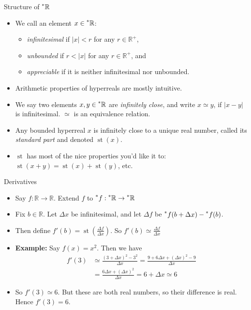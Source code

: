 \documentclass{beamer}
\theoremstyle{plain}
\theoremstyle{definition}
\newcommand{\stp}[1]{\st\left(#1\right)}
\newcommand{\reals}{\mathbb{R}}
\newcommand{\hreals}{\prescript{*}{}{\mathbb{R}}}
\newcommand{\hr}[1]{\prescript{*}{}{#1}}
\DeclareMathOperator{\st}{st}
\begin{document}
\begin{frame}{Structure of $\hreals$}
\begin{itemize}
\setlength{\itemsep}{10pt}
\item We call an element $x \in \hreals$:
	\begin{itemize}
	\item \textit{infinitesimal} if $|x| < r$ for any $r \in \reals^+$,
	\item \textit{unbounded} if $r < |x|$ for any $r \in \reals^+$, and
	\item \textit{appreciable} if it is neither infinitesimal nor unbounded.
	\end{itemize}
\item Arithmetic properties of hyperreals are mostly intuitive.
\item We say two elements $x, y \in \hreals$ are \textit{infinitely close}, and write $x \simeq y$, if $|x - y|$ is infinitesimal. $\simeq$ is an equivalence relation.
\item Any bounded hyperreal $x$ is infinitely close to a unique real number, called its \textit{standard part} and denoted $\stp{x}$.
\item $\st$ has most of the nice properties you'd like it to: $\stp{x + y} = \stp{x} + \stp{y}$, etc.
\end{itemize}
\end{frame}


\begin{frame}{Derivatives}
\begin{itemize}
\item Say $f: \reals \to \reals$. Extend $f$ to $\hr{f}: \hreals \to \hreals$
\item Fix $b \in \reals$. Let $\Delta x$ be infinitesimal, and let $\Delta f$ be $\hr{f}(b + \Delta x) - \hr{f}(b)$.
\item Then define $f'(b) = \stp{\frac{\Delta f}{\Delta x}}$. So $f'(b) \simeq \frac{\Delta f}{\Delta x}$
\item \textbf{Example:} Say $f(x) = x^2$. Then we have 
\begin{align*}
f'(3) &\simeq \frac{(3 + \Delta x)^2 - 3^2}{\Delta x} = \frac{9 + 6 \Delta x + (\Delta x)^2 - 9}{\Delta x} \\
	&= \frac{6 \Delta x + (\Delta x)^2}{\Delta x} = 6 + \Delta x \simeq 6
\end{align*}
\item So $f'(3) \simeq 6$. But these are both real numbers, so their difference is real. Hence $f'(3) = 6$.
\end{itemize}
\end{frame}
\end{document}
